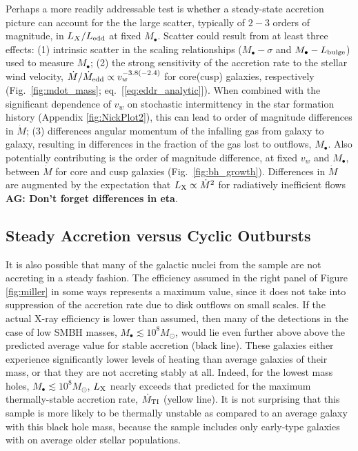 \documentclass[usenatbib,fleqn]{mn2e}
\newcommand{\Mbh}[1][]{M_{\bullet#1}}
\begin{document}
Perhaps a more readily addressable test is whether a steady-state accretion
picture can account for the the large scatter, typically of $2-3$ orders of magnitude, in $L_{X}/L_{\rm
  edd}$ at fixed $M_{\bullet}$.  Scatter could result from at 
least three effects: (1) intrinsic scatter in the scaling relationships ($\Mbh-\sigma$ and $\Mbh-L_{\rm
  bulge}$) used to measure $\Mbh$; (2) the strong sensitivity of the accretion rate to
the stellar wind velocity, $\dot{M}/\dot{M}_{\rm edd} \propto
v_{w}^{-3.8(-2.4)}$ for core(cusp) galaxies, respectively
(Fig.~\ref{fig:mdot_mass}; eq.~[\ref{eq:eddr_analytic}]).  When 
combined with the significant dependence of $v_w$ on stochastic
intermittency in the star formation history (Appendix
\ref{fig:NickPlot2}), this can lead to order of magnitude differences
in $\dot{M}$; (3) differences angular momentum of the infalling gas
from galaxy to galaxy, resulting in differences in the fraction of the
gas lost to outflows, $\Mbh$.  Also potentially contributing is the
order of magnitude difference, at fixed $v_w$ and $M_{\bullet}$,
between $\dot{M}$ for core and cusp galaxies
(Fig.~\ref{fig:bh_growth}).  Differences in $\dot{M}$ are augmented by
the expectation that $L_{\rm X} \propto \dot{M}^{2} $ for radiatively
inefficient flows {\bf AG: Don't forget differences in eta}. 





\subsection{Steady Accretion versus Cyclic Outbursts}
\label{sec:cycle}

It is also possible that many of the galactic nuclei from the
\citet{Miller+15} sample are not accreting in a steady fashion.  The
efficiency assumed in the right panel of Figure \ref{fig:miller} in
some ways represents a maximum value, since it does not take into
suppression of the accretion rate due to disk outflows on small
scales.  If the actual X-ray efficiency is lower than assumed, then
many of the detections in the case of low SMBH masses, $M_{\bullet}
\lesssim 10^{8}M_{\odot}$, would lie even further above above the
predicted average value for stable accretion (black line).  These
galaxies either experience significantly lower levels of heating than
average galaxies of their mass, or that they are not accreting stably
at all.  Indeed, for the lowest mass holes, $M_{\bullet} \lesssim
10^{8}M_{\odot}$, $L_{\rm X}$ nearly exceeds that predicted for the
maximum thermally-stable accretion rate, $\dot{M}_{\rm TI}$ (yellow
line).  It is not surprising that this sample is more likely to be
thermally unstable as compared to an average galaxy with this black
hole mass, because the \citet{Miller+15} sample includes only
early-type galaxies with on average older stellar populations.
\end{document}
